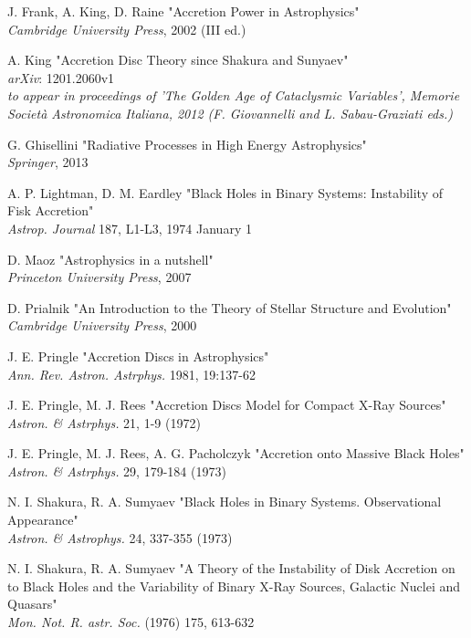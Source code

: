\documentclass[a4paperbi]{article}
\begin{document}
\begin{thebibliography}{9}
	J. Frank, A. King, D. Raine
	"Accretion Power in Astrophysics"\\
	\textit{Cambridge University Press}, 2002 (III ed.)
	
	A. King 
	"Accretion Disc Theory since Shakura and Sunyaev"\\
	\textit{arXiv}: 1201.2060v1\\
	\textit{to appear in proceedings of 'The Golden Age of Cataclysmic Variables', Memorie Società Astronomica Italiana, 2012 (F. Giovannelli and L. Sabau-Graziati eds.)}
	
	G. Ghisellini
	"Radiative Processes in High Energy Astrophysics"\\
	\textit{Springer}, 2013
	
	A. P. Lightman, D. M. Eardley 
	"Black Holes in Binary Systems: Instability of Fisk Accretion"\\
	\textit{Astrop. Journal} 187, L1-L3, 1974 January 1
	
	D. Maoz
	"Astrophysics in a nutshell"\\
	\textit{Princeton University Press}, 2007
	
	D. Prialnik
	"An Introduction to the Theory of Stellar Structure and Evolution"\\
	\textit{Cambridge University Press}, 2000
	
	J. E. Pringle 
	"Accretion Discs in Astrophysics"\\
	\textit{Ann. Rev. Astron. Astrphys.} 1981, 19:137-62
	
	J. E. Pringle, M. J. Rees
	"Accretion Discs Model for Compact X-Ray Sources"\\
	\textit{Astron. \& Astrphys.} 21, 1-9 (1972)
	
	J. E. Pringle, M. J. Rees, A. G. Pacholczyk
	"Accretion onto Massive Black Holes"\\
	\textit{Astron. \& Astrphys.} 29, 179-184 (1973)
	
	N. I. Shakura, R. A. Sumyaev 
	"Black Holes in Binary Systems. Observational Appearance"\\
	\textit{Astron. \& Astrophys.} 24, 337-355 (1973)
	
	N. I. Shakura, R. A. Sumyaev 
	"A Theory of the Instability of Disk Accretion on to Black Holes and the Variability of Binary X-Ray Sources, Galactic Nuclei and Quasars"\\
	\textit{Mon. Not. R. astr. Soc.} (1976) 175, 613-632
	

\end{thebibliography}
\end{document}
